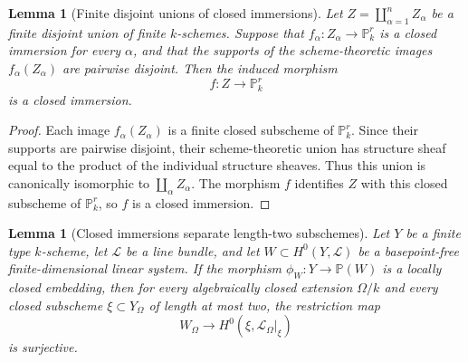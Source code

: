 \documentclass{lms}
\newtheorem{lemma}[theorem]{Lemma}
\newcommand{\PP}{\mathbb P}
\begin{document}
\begin{lemma}[Finite disjoint unions of closed immersions]\label{lem:finite-disjoint-closed-immersion}
Let $Z=\coprod_{\alpha=1}^n Z_\alpha$ be a finite disjoint union of finite $k$-schemes.  Suppose that $f_\alpha:Z_\alpha\to\PP^r_k$ is a closed immersion for every $\alpha$, and that the supports of the scheme-theoretic images $f_\alpha(Z_\alpha)$ are pairwise disjoint.  Then the induced morphism
\[
        f:Z\longrightarrow\PP^r_k
\]
is a closed immersion.
\end{lemma}

\begin{proof}
Each image $f_\alpha(Z_\alpha)$ is a finite closed subscheme of $\PP^r_k$.  Since their supports are pairwise disjoint, their scheme-theoretic union has structure sheaf equal to the product of the individual structure sheaves.  Thus this union is canonically isomorphic to $\coprod_\alpha Z_\alpha$.  The morphism $f$ identifies $Z$ with this closed subscheme of $\PP^r_k$, so $f$ is a closed immersion.
\end{proof}

\begin{lemma}[Closed immersions separate length-two subschemes]\label{lem:closed-immersion-separates-length-two}
Let $Y$ be a finite type $k$-scheme, let $\mathcal L$ be a line bundle, and let $W\subset H^0(Y,\mathcal L)$ be a basepoint-free finite-dimensional linear system.  If the morphism $\phi_W:Y\to\PP(W)$ is a locally closed embedding, then for every algebraically closed extension $\Omega/k$ and every closed subscheme $\xi\subset Y_\Omega$ of length at most two, the restriction map
\[
        W_\Omega\to H^0(\xi,\mathcal L_\Omega|_\xi)
\]
is surjective.
\end{lemma}
\end{document}
